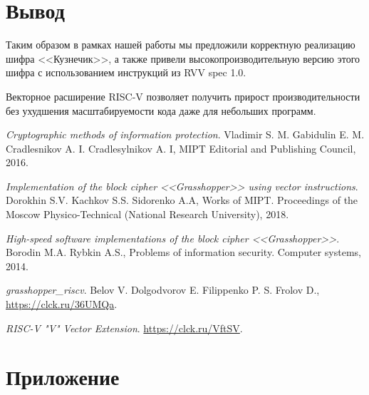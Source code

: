 \documentclass[a4paper, 12pt]{article}
\begin{document}
    \section{Вывод}

    Таким образом в рамках нашей работы мы предложили корректную реализацию шифра 
    <<Кузнечик>>, а также привели высокопроизводительную версию этого шифра с 
    использованием инструкций из RVV spec 1.0. 
    
    Векторное расширение RISC-V позволяет получить прирост производительности без ухудшения масштабируемости кода даже для небольших программ.

    \newpage
    
    \nocite{*}
    \renewcommand{\refname}{Литература} 
    

    \renewcommand{\refname}{References} 
    \begin{thebibliography}{9} 
    
    \emph{Cryptographic methods of information protection}. Vladimir S. M. Gabidulin E. M. Cradlesnikov A. I. Cradlesylnikov A. I, MIPT Editorial and Publishing Council, 2016. 

    \emph{Implementation of the block cipher <<Grasshopper>> using vector instructions}. Dorokhin S.V. Kachkov S.S. Sidorenko A.A, Works of MIPT. Proceedings of the Moscow Physico-Technical (National Research University), 2018. 

    \emph{High-speed software implementations of the block cipher <<Grasshopper>>}. Borodin M.A. Rybkin A.S., Problems of information security. Computer systems, 2014. 

    \emph{grasshopper\_riscv}. Belov V. Dolgodvorov E. Filippenko P. S. Frolov D., \href{https://clck.ru/36UMQa}{https://clck.ru/36UMQa}. 

    \emph{RISC-V "V" Vector Extension}.  \href{https://clck.ru/VftSV}{https://clck.ru/VftSV}. 
    
    \end{thebibliography} 

    \newpage

    \section{Приложение}
\end{document}
